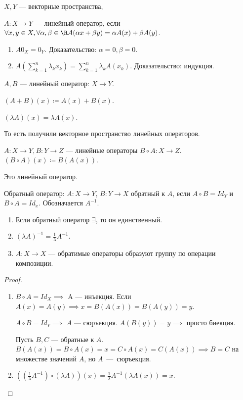 \begin{definition}
    $X, Y$ --- векторные пространства,  

    $A\!: X \to Y$ --- линейный оператор, если $\forall x, y \in X, \forall \alpha, \beta \in \R A(\alpha x + \beta y) = \alpha A(x) + \beta A(y)$.
\end{definition}
\begin{properties}
\begin{enumerate}
    \item $A 0_X = 0_Y$. Доказательство: $\alpha = 0, \beta = 0$.
    \item $A (\sum\limits_{k=1}^n \lambda_k x_k) = \sum\limits_{k=1}^n \lambda_k A(x_k)$. Доказательство: индукция.
\end{enumerate}
\end{properties}
\begin{definition}
    $A, B$ --- линейный оператор:  $X \to Y$.

     $(A+B)(x) \coloneqq A(x) + B(x)$.

      $(\lambda A)(x) = \lambda A(x)$. 

      То есть получили векторное пространство линейных операторов.
\end{definition}
\begin{definition}
    $A\!: X \to Y, B\!: Y \to Z$ --- линейные операторы  $B \circ A\!: X \to Z$.  $(B \circ A)(x) \coloneqq B(A(x))$.
\end{definition}
\begin{remark}
    Это линейный оператор.
\end{remark}
\begin{definition}
    Обратный оператор: $A\!: X \to Y$,  $B\!: Y \to X$ обратный к  $A$, если  $A \circ B = Id_Y$ и  $B \circ A = Id_x$. Обозначается $A^{-1}$.
\end{definition}
\begin{properties}
    \begin{enumerate}
        \item Если обратный оператор $\exists$, то он единственный.
        \item  $(\lambda A)^{-1} = \frac{1}{\lambda} A^{-1}$.
        \item $A\!: X \to X$ --- обратимые операторы образуют группу по операции композиции.
    \end{enumerate}
\end{properties}
\begin{proof}
    \begin{enumerate}
        \item $B \circ A = Id_X \implies$ A --- инъекция. Если  $A(x) = A(y) \implies x = B(A(x)) = B(A(y)) = y$.

             $A \circ B = Id_Y \implies$  $A$ --- сюръекция.  $A(B(y)) = y \implies$ просто биекция. 

             Пусть  $B, C$ --- обратные к  $A$.  $B(A(x)) = B \circ A(x) = x = C \circ A(x) = C(A(x)) \implies B = C$ на множестве значений $A$, но $A$~---~сюръекция.
         \item $((\frac{1}{\lambda}A^{-1}) \circ (\lambda A))(x) = \frac{1}{\lambda}A^{-1}(\lambda A(x)) = x$.
    \end{enumerate}
\end{proof}
